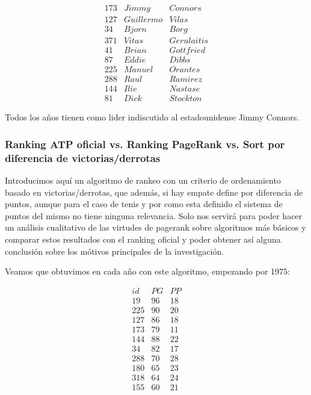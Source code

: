 \begin{eqnarray*}
173 & Jimmy & Connors \\
127 & Guillermo & Vilas \\
34 & Bjorn & Borg \\
371 & Vitas & Gerulaitis \\
41 & Brian & Gottfried \\
87 & Eddie & Dibbs \\
225 & Manuel & Orantes \\
288 & Raul & Ramirez \\
144 & Ilie & Nastase \\
81 & Dick & Stockton 
\end{eqnarray*}

Todos los años tienen como lider indiscutido al estadounidense Jimmy Connors.

\subsubsection{Ranking ATP oficial vs. Ranking PageRank vs. Sort por diferencia de victorias/derrotas}

Introducimos aquí un algoritmo de rankeo con un criterio de ordenamiento basado en victorias/derrotas, que además, si hay empate define por diferencia de puntos, aunque para el caso de tenis y por como esta definido el sistema de puntos del mismo no tiene ninguna relevancia. Solo nos servirá para poder hacer un análisis cualitativo de las virtudes de pagerank sobre algoritmos más básicos y comparar estos resultados con el ranking oficial y poder obtener así alguna conclusión sobre los mótivos principales de la investigación.

Veamos que obtuvimos en cada año con este algoritmo, empezando por 1975:

\begin{eqnarray*}
id & PG & PP \\
19 & 96 & 18 \\
225 & 90  & 20 \\
127 & 86 & 18 \\
173 & 79 & 11 \\
144 & 88 & 22 \\
34 & 82 & 17 \\
288 & 70 & 28 \\
180 & 65 & 23 \\
318 & 64 & 24 \\
155 & 60 & 21 \\
\end{eqnarray*}

